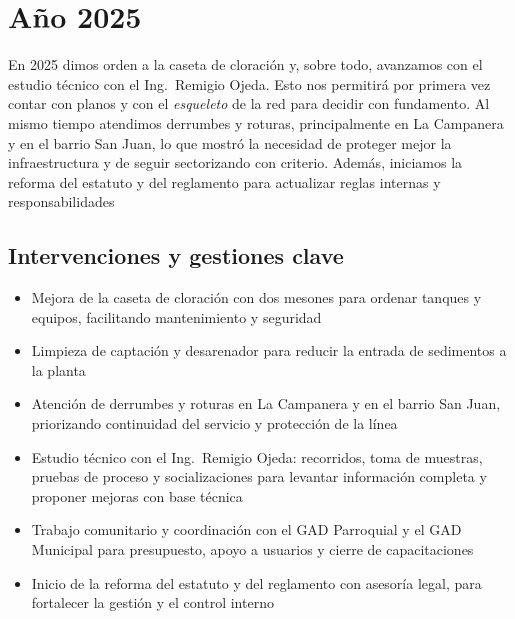\section{Año 2025}

En 2025 dimos orden a la caseta de cloración y, sobre todo, avanzamos con el estudio técnico con el Ing.\ Remigio Ojeda. Esto nos permitirá por primera vez contar con planos y con el \emph{esqueleto} de la red para decidir con fundamento. Al mismo tiempo atendimos derrumbes y roturas, principalmente en La Campanera y en el barrio San Juan, lo que mostró la necesidad de proteger mejor la infraestructura y de seguir sectorizando con criterio. Además, iniciamos la reforma del estatuto y del reglamento para actualizar reglas internas y responsabilidades

\subsection*{Intervenciones y gestiones clave}
\begin{itemize}[noitemsep, topsep=0pt]
  \item Mejora de la caseta de cloración con dos mesones para ordenar tanques y equipos, facilitando mantenimiento y seguridad
  \item Limpieza de captación y desarenador para reducir la entrada de sedimentos a la planta
  \item Atención de derrumbes y roturas en La Campanera y en el barrio San Juan, priorizando continuidad del servicio y protección de la línea
  \item Estudio técnico con el Ing.\ Remigio Ojeda: recorridos, toma de muestras, pruebas de proceso y socializaciones para levantar información completa y proponer mejoras con base técnica
  \item Trabajo comunitario y coordinación con el GAD Parroquial y el GAD Municipal para presupuesto, apoyo a usuarios y cierre de capacitaciones
  \item Inicio de la reforma del estatuto y del reglamento con asesoría legal, para fortalecer la gestión y el control interno
\end{itemize}

